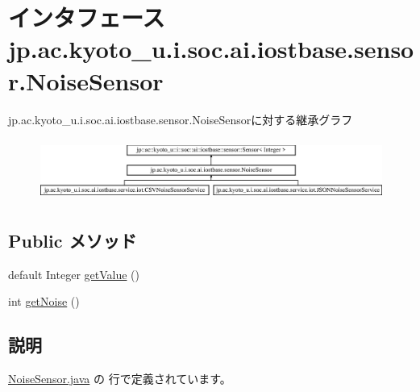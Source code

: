 \hypertarget{interfacejp_1_1ac_1_1kyoto__u_1_1i_1_1soc_1_1ai_1_1iostbase_1_1sensor_1_1_noise_sensor}{\section{インタフェース jp.\-ac.\-kyoto\-\_\-u.\-i.\-soc.\-ai.\-iostbase.\-sensor.\-Noise\-Sensor}
\label{interfacejp_1_1ac_1_1kyoto__u_1_1i_1_1soc_1_1ai_1_1iostbase_1_1sensor_1_1_noise_sensor}
}
jp.\-ac.\-kyoto\-\_\-u.\-i.\-soc.\-ai.\-iostbase.\-sensor.\-Noise\-Sensorに対する継承グラフ\begin{figure}[H]
\begin{center}
\leavevmode
\includegraphics[height=2.058824cm]{interfacejp_1_1ac_1_1kyoto__u_1_1i_1_1soc_1_1ai_1_1iostbase_1_1sensor_1_1_noise_sensor}
\end{center}
\end{figure}
\subsection*{Public メソッド}
\begin{DoxyCompactItemize}
\item 
default Integer \hyperlink{interfacejp_1_1ac_1_1kyoto__u_1_1i_1_1soc_1_1ai_1_1iostbase_1_1sensor_1_1_noise_sensor_a84fb506575c739a9fc1ab4772a6e2f5a}{get\-Value} ()
\item 
int \hyperlink{interfacejp_1_1ac_1_1kyoto__u_1_1i_1_1soc_1_1ai_1_1iostbase_1_1sensor_1_1_noise_sensor_ab735210bde1b027f5c2b40c21f32490b}{get\-Noise} ()
\end{DoxyCompactItemize}


\subsection{説明}


 \hyperlink{_noise_sensor_8java_source}{Noise\-Sensor.\-java} の  行で定義されています。



